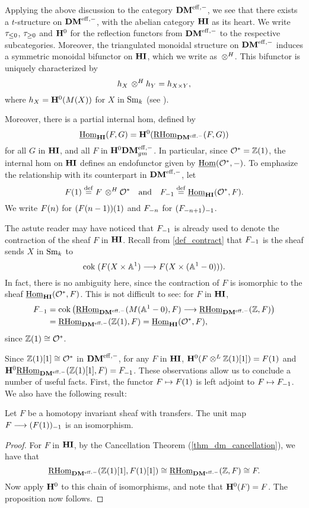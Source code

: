Applying the above discussion to the category $\DMeff$, we see 
that there exists a $t$-structure on $\DMeff$, with the abelian 
category $\HI$ as its heart. We write $\gltrunc{0}$, $\ggtrunc{0}$
and $\HH^0$ for the reflection functors from $\DMeff$ to the 
respective subcategories. Moreover, the triangulated monoidal 
structure on $\DMeff$ induces a symmetric monoidal bifunctor on 
$\HI$, which we write as $\tHI$. This bifunctor is uniquely 
characterized by
\[
\hS{X} \tHI \hS{Y} = \hS{X \times Y},
\]
where $\hS{X} = \HH^0(M(X))$ for $X$ in $\Sm$ (see 
\cite{DegModHom}).

Moreover, there is a partial internal hom, defined by
\[
\ihomHI(F, G) = \HH^0(\ihomDMf(F, G))
\]
for all $G$ in $\HI$, and all $F$ in $\HH^0\DMeffgm$. In 
particular, since $\Ox = \Z(1)$, the internal hom on $\HI$ 
defines an endofunctor given by $\ihom(\Ox, -)$. To emphasize the
relationship with its counterpart in $\DMeff$, let
\[
\LHI{F} \defeq F \tHI \Ox \hspace{10pt} \textrm{and}\hspace{10pt} 
   \RHI{F} \defeq \ihomHI(\Ox, F).
\]
We write $\LHI[n]{F}$ for $\LHI{(\LHI[n - 1]{F})}$ and 
$\RHI[n]{F}$ for $\RHI{(\RHI[n + 1]{F})}$.

\begin{rmk}\label{rmk_contraction}
The astute reader may have noticed that $\RHI{F}$ is already used
to denote the contraction of the sheaf $F$ in $\HI$. Recall from 
\ref{def_contract} that $\RHI{F}$ is the sheaf sends $X$ in $\Sm$ to 
\[
\cok( F(X \times \A^1) \to F(X \times (\A^1 - 0))).
\]
In fact, there is no ambiguity here, since the contraction of
$F$ is isomorphic to the sheaf $\ihomHI(\Ox, F)$. This is not 
difficult to see: for $F$ in $\HI$,
\begin{align*}
\RHI{F} &= \mathrm{cok}\left(\ihomDMf(M(\A^1 - 0), F) \to \ihomDMf(\Z, F)\right) \\
&= \ihomDMf(\Z(1), F) = \ihomHI(\Ox, F),
\end{align*}
since $\Z(1) \cong \Ox$.
\end{rmk}

Since $\Z(1)[1] \cong \O^*$ in $\DMeff$, for any $F$ in $\HI$, 
$\HH^0(F \tDM \Z(1)[1]) = \LHI{F}$ and $\HH^0\ihomDMf(\Z(1)[1], F) 
= \RHI{F}$. These observations allow us to conclude a number of useful
facts. First, the functor $F \mapsto \LHI{F}$ is left adjoint to 
$F \mapsto \RHI{F}$. We also have the following result:

\begin{prop}\label{prop_unit_iso}
Let $F$ be a homotopy invariant sheaf with transfers. The unit map 
$F \to \RHI{(\LHI{F})}$ is an isomorphism.
\end{prop}
\begin{proof}
For $F$ in $\HI$, by the Cancellation Theorem 
(\ref{thm_dm_cancellation}), we have that 
\[
\ihomDMf(\Z(1)[1], F(1)[1]) \cong \ihomDMf(\Z, F) 
\cong F. 
\]
Now apply $\HH^0$ to this chain of isomorphisms, and note 
that $\HH^0(F) = F$. The proposition now follows.
\end{proof}

